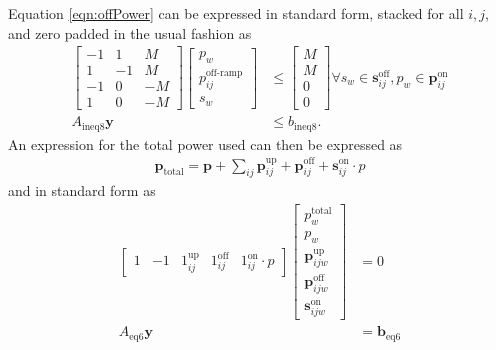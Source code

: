 	Equation \ref{eqn:offPower} can be expressed in standard form, stacked for all $i,j$, and zero padded in the usual fashion as 
\begin{equation}\begin{aligned} 
	\begin{bmatrix}
		-1 & 1 & M  \\
		1  & -1 & M \\
		-1 & 0 & -M \\
		1 & 0 & -M 
	\end{bmatrix}	
	\begin{bmatrix} p_w                      \\
		        p_{ij}^{\text{off-ramp}} \\
			s_w
	\end{bmatrix} &\le
	\begin{bmatrix} M \\
	                M \\
	                0 \\
	                0
	\end{bmatrix} \forall s_w \in \mathbf{s}_{ij}^{\text{off}}, p_w \in \mathbf{p}_{ij}^{\text{on}} \\
	A_{\text{ineq8}}\mathbf{y} & \le b_{\text{ineq8}}.
\end{aligned}\end{equation} 
An expression for the total power used can then be expressed as
\begin{equation}
	\begin{aligned}
		\mathbf{p}_{\text{total}} = \mathbf{p} + \sum_{ij} \mathbf{p}^{\text{up}}_{ij} + \mathbf{p}^{\text{off}}_{ij} + \mathbf{s}^{\text{on}}_{ij}\cdot p
	\end{aligned}
\end{equation}
and in standard form as
\begin{equation} \begin{aligned}
	\begin{bmatrix}
		1 & -1 & 1_{ij}^{\text{up}} & 1_{ij}^{\text{off}} & 1_{ij}^{\text{on}}\cdot p  
	\end{bmatrix}
	\begin{bmatrix}
		p^{\text{total}}_w            \\
		p_w                           \\
	        \mathbf{p}_{ijw}^{\text{up}}  \\
	        \mathbf{p}_{ijw}^{\text{off}} \\ 
	        \mathbf{s}_{ijw}^{\text{on}}
	\end{bmatrix} &= 0 \\
	A_{\text{eq6}}\mathbf{y} &= \mathbf{b}_{\text{eq6}} 
\end{aligned} \end{equation}

